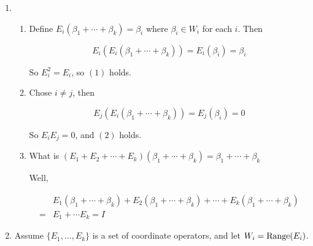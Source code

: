 \documentclass[12pt]{article}
\begin{document}
  {
    \begin{enumerate}[label=(\Alph*)]
      \item 

        \begin{enumerate}[label=\arabic*.]
          \item Define $E_i(\beta_1 + \cdots + \beta_k) = \beta_i$ where $\beta_i \in W_i$ for each $i$. Then

            \[
              E_i(E_i(\beta_1 + \cdots + \beta_k)) = E_i(\beta_i) = \beta_i
            \]

            So $E_i^2 = E_i$, so $(1)$ holds.

          \item Chose $i \ne j$, then

            \[
              E_j(E_i(\beta_1 + \cdots + \beta_k)) = E_j(\beta_i) = 0
            \]

            So $E_i E_j = 0$, and $(2)$ holds.

          \item What is $(E_1 + E_2 + \cdots + E_k)(\beta_1 + \cdots + \beta_k)
            = \beta_1 + \cdots + \beta_k$

            Well, 

            \begin{align*}
              &E_1(\beta_1 + \cdots + \beta_k) + E_2(\beta_1 + \cdots + \beta_k) + \cdots + E_k(\beta_1 + \cdots + \beta_k) \\
              =&E_1 + \cdots E_k = I
            \end{align*}
        \end{enumerate}

      \item Assume $\{E_1, \dots, E_k\}$ is a set of coordinate operators, and
        let $W_i = \mathrm{Range}(E_i)$.


\end{enumerate}}
\end{document}
